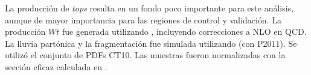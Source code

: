 La producción de \emph{tops} resulta en un fondo poco importante para este análisis,
aunque de mayor importancia para las regiones de control y validación. La producción $Wt$
fue generada utilizando {\powheg}, incluyendo correcciones a NLO en QCD. La lluvia
partónica y la fragmentación fue simulada utilizando {\pythia} (con P2011).
Se utilizó el conjunto de PDFs CT10. Las muestras fueron normalizadas con
la sección eficaz calculada en \cite{Kidonakis:2010ux}.


